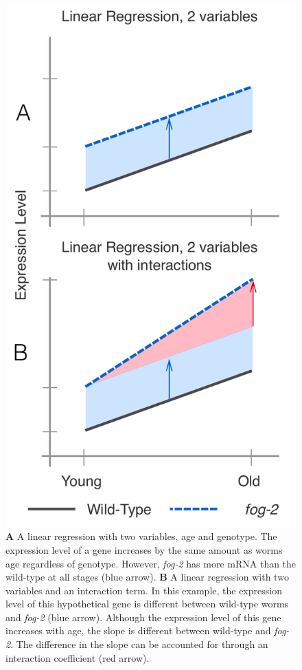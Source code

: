 \documentclass[10pt,letterpaper,twocolumn]{article}
\newcommand{\fog}{\emph{\mbox{fog-2}}}
\begin{document}
\begin{figure}[htbp]
\renewcommand{\familydefault}{\sfdefault}\normalfont{}
\centering
\includegraphics[width=0.9\linewidth]{../output/figs/final_figs/linear_regression.pdf}
\caption{\textbf{A} A linear regression with two variables, age and genotype.
The expression level of a gene increases by the same amount as worms age
regardless of genotype. However, \fog{} has more mRNA than the wild-type at all
stages (blue arrow). \textbf{B} A linear regression with two variables and an
interaction term. In this example, the expression level of this hypothetical
gene is different between wild-type worms and \fog{} (blue arrow). Although the
expression level of this gene increases with age, the slope is different between
wild-type and \fog{}. The difference in the slope can be accounted for through
an interaction coefficient (red arrow).
}
\label{fig:linear_reg}
\end{figure}
\end{document}

